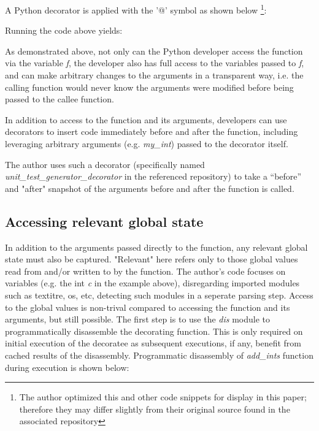 A Python decorator is applied with the '@' symbol as shown below
\footnote{The author optimized this and other code snippets for display in 
this paper; therefore they may differ slightly from their original 
source found in the associated repository}:



Running the code above yields:



As demonstrated above, not only can the Python developer access the function
via the variable \textit{f}, the developer also has full
access to the variables passed to \textit{f}, and can make 
arbitrary changes to the arguments in a transparent way, 
i.e. the calling function would never know the arguments 
were modified before being passed to the callee function.

In addition to access to the function and its arguments,
developers can use decorators to insert code immediately before and after 
the function, including leveraging arbitrary arguments (e.g.
\textit{my\_int}) passed to the decorator itself.

The author uses such a decorator (specifically named 
\break
\textit{unit\_test\_generator\_decorator} in the referenced repository) to take
 a “before” and "after" snapshot of the arguments
before and after the function is called.

%
\subsection{Accessing relevant global state}\label{sec:approach-internal-2}

In addition to the arguments passed directly to the function, any relevant 
global state must also be captured. "Relevant" here refers only to those 
global values read from and/or written to by the function.
The author's code focuses on variables (e.g. the int \textit{c} in the example above), 
disregarding imported modules such as textit{re, os, etc}, detecting such
modules in a seperate parsing step.
Access to the global values is non-trival compared to accessing the function 
and its arguments, but still possible.  The first step is to use the \textit{dis}
module to programmatically disassemble the decorating function.  This is only 
required on initial execution of the decoratee as subsequent executions, if any, 
benefit from cached results of the disassembly.
Programmatic disassembly of \textit{add\_ints} function during execution is shown below:

